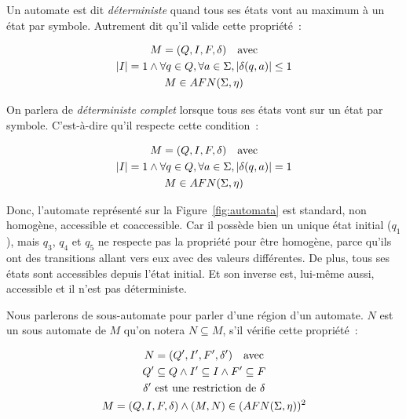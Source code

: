\begin{definition}
    Un automate est dit \textit{déterministe} quand tous ses états vont au
    maximum à un état par symbole. Autrement dit qu'il valide cette propriété~:

    \begin{gather*}
        M = (Q, I, F, \delta) \quad \text{avec} \\
        |I| = 1 \land \forall q \in Q, \forall a \in \Sigma, | \delta(q, a) | \leq 1\\
        M \in AFN(\Sigma, \eta) \notag
    \end{gather*}

    On parlera de \textit{déterministe complet} lorsque tous ses états vont sur
    un état par symbole. C'est-à-dire qu'il respecte cette condition~:

    \begin{gather*}
        M = (Q, I, F, \delta) \quad \text{avec} \\
        |I| = 1 \land \forall q \in Q, \forall a \in \Sigma, | \delta(q, a) | = 1\\
        M \in AFN(\Sigma, \eta) \notag
    \end{gather*}
\end{definition}

\begin{example}
    Donc, l'automate représenté sur la Figure~\ref{fig:automata} est standard,
    non homogène, accessible et coaccessible. Car il possède bien un unique
    état initial (\(q_1\)), mais \(q_3\), \(q_4\) et \(q_5\) ne respecte pas la
    propriété pour être homogène, parce qu'ils ont des transitions allant vers
    eux avec des valeurs différentes. De plus, tous ses états sont accessibles
    depuis l'état initial. Et son inverse est, lui-même aussi, accessible et il
    n'est pas déterministe.
\end{example}

\begin{definition}
    Nous parlerons de sous-automate pour parler d'une \og{}région\fg{} d'un
    automate. \(N\) est un sous automate de \(M\) qu'on notera \(N \subseteq
    M\), s'il vérifie cette propriété~:

    \begin{gather*}
        N = (Q', I', F', \delta') \quad \text{avec} \\
        Q' \subseteq Q \land I' \subseteq I \land F' \subseteq F \\
        \delta' \text{ est une restriction de } \delta \\
        M = (Q, I, F, \delta) \land (M, N) \in (AFN(\Sigma, \eta))^2 \notag
    \end{gather*}
\end{definition}

